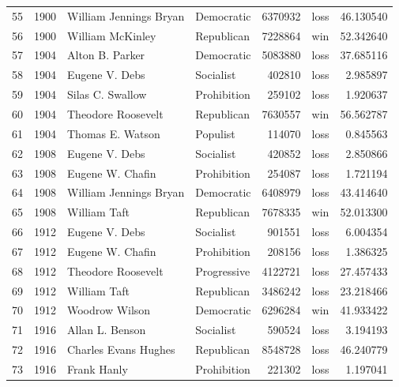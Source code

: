\documentclass[
  letterpaper,
  DIV=11,
  numbers=noendperiod]{scrreprt}
\begin{document}
\begin{tabular}{lrllrlr}
55  &  1900 &  William Jennings Bryan &             Democratic &       6370932 &   loss &  46.130540 \\
56  &  1900 &        William McKinley &             Republican &       7228864 &    win &  52.342640 \\
57  &  1904 &         Alton B. Parker &             Democratic &       5083880 &   loss &  37.685116 \\
58  &  1904 &          Eugene V. Debs &              Socialist &        402810 &   loss &   2.985897 \\
59  &  1904 &        Silas C. Swallow &            Prohibition &        259102 &   loss &   1.920637 \\
60  &  1904 &      Theodore Roosevelt &             Republican &       7630557 &    win &  56.562787 \\
61  &  1904 &        Thomas E. Watson &               Populist &        114070 &   loss &   0.845563 \\
62  &  1908 &          Eugene V. Debs &              Socialist &        420852 &   loss &   2.850866 \\
63  &  1908 &        Eugene W. Chafin &            Prohibition &        254087 &   loss &   1.721194 \\
64  &  1908 &  William Jennings Bryan &             Democratic &       6408979 &   loss &  43.414640 \\
65  &  1908 &            William Taft &             Republican &       7678335 &    win &  52.013300 \\
66  &  1912 &          Eugene V. Debs &              Socialist &        901551 &   loss &   6.004354 \\
67  &  1912 &        Eugene W. Chafin &            Prohibition &        208156 &   loss &   1.386325 \\
68  &  1912 &      Theodore Roosevelt &            Progressive &       4122721 &   loss &  27.457433 \\
69  &  1912 &            William Taft &             Republican &       3486242 &   loss &  23.218466 \\
70  &  1912 &          Woodrow Wilson &             Democratic &       6296284 &    win &  41.933422 \\
71  &  1916 &         Allan L. Benson &              Socialist &        590524 &   loss &   3.194193 \\
72  &  1916 &    Charles Evans Hughes &             Republican &       8548728 &   loss &  46.240779 \\
73  &  1916 &             Frank Hanly &            Prohibition &        221302 &   loss &   1.197041 \\

\end{tabular}
\end{document}
